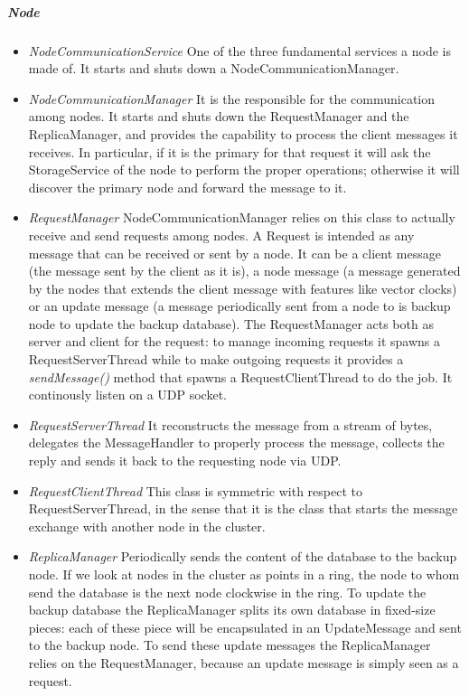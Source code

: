 \documentclass{article}
\begin{document}
\subparagraph{Node} 
\begin{itemize}
\item \textit{NodeCommunicationService} One of the three fundamental services a node is made of. It starts and shuts down a NodeCommunicationManager.
\item \textit{NodeCommunicationManager} It is the responsible for the communication among nodes. It starts and shuts down the RequestManager and the ReplicaManager, and provides the capability to process the client messages it receives. In particular, if it is the primary for that request it will ask the StorageService of the node to perform the proper operations; otherwise it will discover the primary node and forward the message to it.
\item \textit{RequestManager} NodeCommunicationManager relies on this class to actually receive and send requests among nodes. A Request is intended as any message that can be received or sent by a node. It can be a client message (the message sent by the client as it is), a node message (a message generated by the nodes that extends the client message with features like vector clocks) or an update message (a message periodically sent from a node to is backup node to update the backup database). The RequestManager acts both as server and client for the request: to manage incoming requests it spawns a RequestServerThread while to make outgoing requests it provides a \textit{sendMessage()} method that spawns a RequestClientThread to do the job. It continously listen on a UDP socket.
\item \textit{RequestServerThread} It reconstructs the message from a stream of bytes, delegates the MessageHandler to properly process the message, collects the reply and sends it back to the requesting node via UDP.
\item \textit{RequestClientThread} This class is symmetric with respect to RequestServerThread, in the sense that it is the class that starts the message exchange with another node in the cluster.
\item \textit{ReplicaManager} Periodically sends the content of the database to the backup node. If we look at nodes in the cluster as points in a ring, the node to whom send the database is the next node clockwise in the ring. To update the backup database the ReplicaManager splits its own database in fixed-size pieces: each of these piece will be encapsulated in an UpdateMessage and sent to the backup node. To send these update messages the ReplicaManager relies on the RequestManager, because an update message is simply seen as a request.
\end{itemize}
\end{document}
